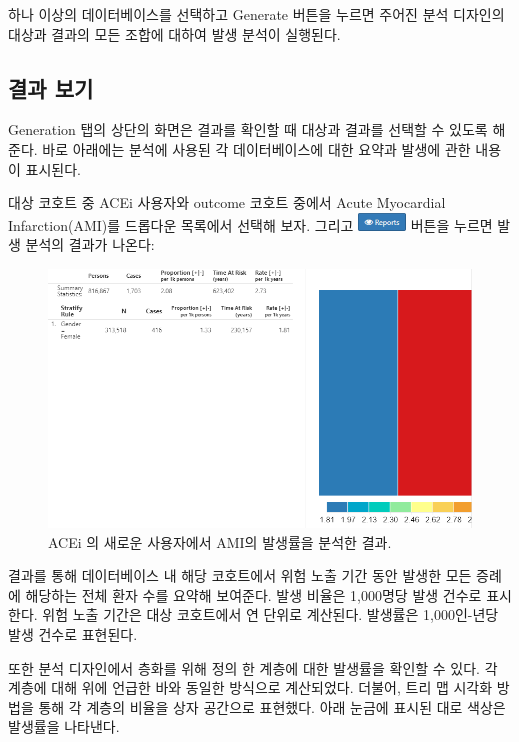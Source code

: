 \documentclass[10.5pt]{book}
\theoremstyle{definition}
\theoremstyle{definition}
\theoremstyle{definition}
\theoremstyle{remark}
\begin{document}
하나 이상의 데이터베이스를 선택하고 Generate 버튼을 누르면 주어진 분석
디자인의 대상과 결과의 모든 조합에 대하여 발생 분석이 실행된다.

\subsection{결과 보기}\label{-}

Generation 탭의 상단의 화면은 결과를 확인할 때 대상과 결과를 선택할 수
있도록 해준다. 바로 아래에는 분석에 사용된 각 데이터베이스에 대한 요약과
발생에 관한 내용이 표시된다.

대상 코호트 중 ACEi 사용자와 outcome 코호트 중에서 Acute Myocardial
Infarction(AMI)를 드롭다운 목록에서 선택해 보자. 그리고
\includegraphics{images/Characterization/atlasIncidenceReportButton.png}
버튼을 누르면 발생 분석의 결과가 나온다:

\begin{figure}

{\centering \includegraphics[width=1\linewidth]{images/Characterization/atlasIncidenceResults} 

}

\caption{ACEi 의 새로운 사용자에서 AMI의 발생률을 분석한 결과.}\label{fig:atlasIncidenceResults}
\end{figure}

결과를 통해 데이터베이스 내 해당 코호트에서 위험 노출 기간 동안 발생한
모든 증례에 해당하는 전체 환자 수를 요약해 보여준다. 발생 비율은
1,000명당 발생 건수로 표시한다. 위험 노출 기간은 대상 코호트에서 연
단위로 계산된다. 발생률은 1,000인-년당 발생 건수로 표현된다.

또한 분석 디자인에서 층화를 위해 정의 한 계층에 대한 발생률을 확인할 수
있다. 각 계층에 대해 위에 언급한 바와 동일한 방식으로 계산되었다.
더불어, 트리 맵 시각화 방법을 통해 각 계층의 비율을 상자 공간으로
표현했다. 아래 눈금에 표시된 대로 색상은 발생률을 나타낸다.
\end{document}
